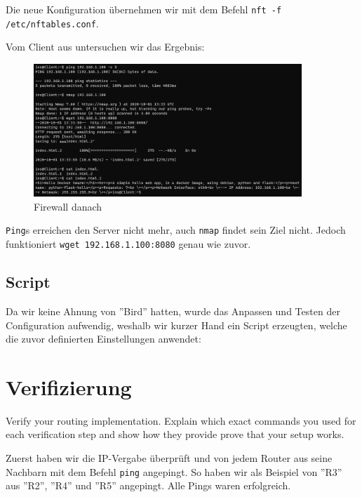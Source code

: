 \documentclass[11pt,titlepage]{article}
\newenvironment{shadedquotation}
 {\begin{shaded*}
  \quoting[leftmargin=0pt, vskip=0pt]
 }
 {\endquoting
 \end{shaded*}
}
\begin{document}


Die neue Konfiguration übernehmen wir mit dem Befehl \lstinline!nft -f /etc/nftables.conf!.

Vom Client aus untersuchen wir das Ergebnis:
\begin{figure}[H]
  \begin{center}
    \includegraphics[width=0.90\textwidth]{images/firewall-after.png}
    \caption{Firewall danach}
    \label{fig:FirewallBefore}
  \end{center}
\end{figure}

\lstinline!Ping!s erreichen den Server nicht mehr, auch \lstinline!nmap! findet sein Ziel nicht. Jedoch funktioniert \lstinline!wget 192.168.1.100:8080! genau wie zuvor. 

\par\medskip

\subsection{Script}
\label{subsec:Script}

Da wir keine Ahnung von ''Bird'' hatten, wurde das Anpassen und Testen der Configuration aufwendig, weshalb wir kurzer Hand ein Script erzeugten, welche die zuvor definierten Einstellungen anwendet:



\section{Verifizierung}
\label{sec:Verifizierung}
\begin{shadedquotation}
  Verify your routing implementation. Explain which exact commands you used for each verification step and show how they provide prove that your setup works.
\end{shadedquotation}
Zuerst haben wir die IP-Vergabe überprüft und von jedem Router aus seine Nachbarn mit dem Befehl \lstinline!ping! angepingt. So haben wir als Beispiel von ''R3'' aus ''R2'', ''R4'' und ''R5'' angepingt.
Alle Pings waren erfolgreich.
\end{document}
